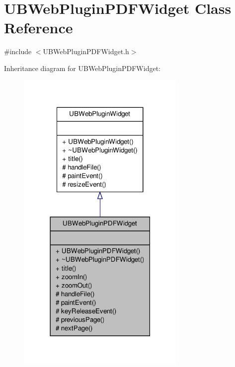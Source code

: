 \hypertarget{class_u_b_web_plugin_p_d_f_widget}{\section{U\-B\-Web\-Plugin\-P\-D\-F\-Widget Class Reference}
\label{d8/d85/class_u_b_web_plugin_p_d_f_widget}
}


{\ttfamily \#include $<$U\-B\-Web\-Plugin\-P\-D\-F\-Widget.\-h$>$}



Inheritance diagram for U\-B\-Web\-Plugin\-P\-D\-F\-Widget\-:
\nopagebreak
\begin{figure}[H]
\begin{center}
\leavevmode
\includegraphics[width=230pt]{da/d08/class_u_b_web_plugin_p_d_f_widget__inherit__graph}
\end{center}
\end{figure}


